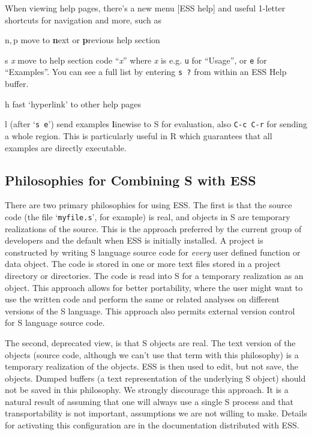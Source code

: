 \documentclass{article}
\newcommand{\stexttt}[1]{{\small\texttt{#1}}}
\newcommand{\file}[1]{`\stexttt{#1}'}
\begin{document}
When viewing help pages, there's a new menu \textsf{[ESS help]} and
useful 1-letter shortcuts for navigation and more, such as
\begin{list}{}{\renewcommand{\makelabel}[1]{\bf#1\hfill}}
 \item[n,\,p] move to \textbf{n}ext or \textbf{p}revious help section
 \item[{s \textit{x}}] move to help section code ``\textit{x}'' where
  \textit{x} is e.g. \stexttt{u} for ``Usage'', or \stexttt{e} for
  ``Examples''.  You can see a full list by entering \stexttt{s ?} from
  within an ESS Help buffer.
 \item[h] fast `hyperlink' to other help pages
 \item[l] (after `\stexttt{s e}') send examples \textbf{l}inewise to S
  for evaluation, also \stexttt{C-c C-r} for sending a whole region.
  This is particularly useful in R which guarantees that all examples
  are directly executable.
\end{list}

\subsection{Philosophies for Combining S with ESS}
\label{sec:S:philosophy}

There are two primary philosophies for using ESS.  The first is that the
source code (the file \file{myfile.s}, for example) is real, and objects
in S are temporary realizations of the source.  This is the approach
preferred by the current group of developers and the default when ESS is
initially installed.  A project is constructed by writing S language
source code for \emph{every} user defined function or data object.  The
code is stored in one or more text files stored in a project directory
or directories.  The code is read into S for a temporary realization as
an object.  This approach allows for better portability, where the user
might want to use the written code and perform the same or related
analyses on different versions of the S language.  This approach also
permits external version control for S language source code.

The second, deprecated view, is that S objects are real.  The text
version of the objects (source code, although we can't use that term
with this philosophy) is a temporary realization of the objects.  ESS
is then used to edit, but not save, the objects.
Dumped buffers (a text representation of the underlying S object)
should not be saved in this philosophy.
We strongly discourage this approach.  It is a natural result of
assuming that one will always use a single S process and that
transportability is not important, assumptions we are not willing to
make.  Details for activating this configuration are in the
documentation distributed with ESS.
\end{document}
